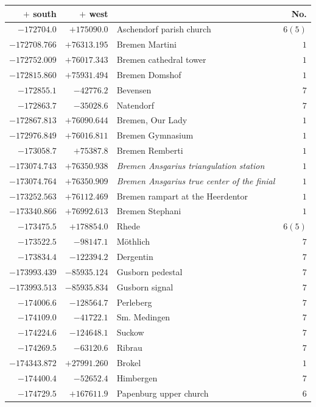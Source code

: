 \clearpage
\begin{center}\begingroup\fontsize{8}{9}\selectfont
\setlength{\tabcolsep}{4pt}
\begin{tabular}{r|r|p{170pt}|r}\hline
\(+\) south&\(+\) west&&No.\\\hline
\(-172704.0\)&\(+175090.0\)&Aschendorf parish church&\(6 (5)\)\\
\(-172708.766\)&\(+76313.195\)&Bremen Martini&\(1\)\\
\(-172752.009\)&\(+76017.343\)&Bremen cathedral tower&\(1\)\\
\(-172815.860\)&\(+75931.494\)&Bremen Domshof&\(1\)\\
\(-172855.1\)&\(-42776.2\)&Bevensen&\(7\)\\
\(-172863.7\)&\(-35028.6\)&Natendorf&\(7\)\\
\(-172867.813\)&\(+76090.644\)&Bremen, Our Lady&\(1\)\\
\(-172976.849\)&\(+76016.811\)&Bremen Gymnasium&\(1\)\\
\(-173058.7\)&\(+75387.8\)&Bremen Remberti&\(1\)\\
\(-173074.743\)&\(+76350.938\)&\textit{Bremen Ansgarius triangulation station}&\(1\)\\
\(-173074.764\)&\(+76350.909\)&\textit{Bremen Ansgarius true center of the finial}&\(1\)\\
\(-173252.563\)&\(+76112.469\)&Bremen rampart at the Heerdentor&\(1\)\\
\(-173340.866\)&\(+76992.613\)&Bremen Stephani&\(1\)\\
\(-173475.5\)&\(+178854.0\)&Rhede&\(6 (5)\)\\
\(-173522.5\)&\(-98147.1\)&Möthlich&\(7\)\\
\(-173834.4\)&\(-122394.2\)&Dergentin&\(7\)\\
\(-173993.439\)&\(-85935.124\)&Gusborn pedestal&\(7\)\\
\(-173993.513\)&\(-85935.834\)&Gusborn signal&\(7\)\\
\(-174006.6\)&\(-128564.7\)&Perleberg&\(7\)\\
\(-174109.0\)&\(-41722.1\)&Sm. Medingen&\(7\)\\
\(-174224.6\)&\(-124648.1\)&Suckow&\(7\)\\
\(-174269.5\)&\(-63120.6\)&Ribrau&\(7\)\\
\(-174343.872\)&\(+27991.260\)&Brokel&\(1\)\\
\(-174400.4\)&\(-52652.4\)&Himbergen&\(7\)\\
\(-174729.5\)&\(+167611.9\)&Papenburg upper church&\(6\)\\

\end{tabular}
\end{center}
